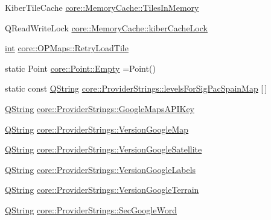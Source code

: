 \begin{DoxyCompactItemize}
\item 
Kiber\-Tile\-Cache \hyperlink{group___o_p_map_widget_gaeb53ae92c08d2646f4ecbcf764e7e226}{core\-::\-Memory\-Cache\-::\-Tiles\-In\-Memory}
\item 
Q\-Read\-Write\-Lock \hyperlink{group___o_p_map_widget_ga9c5f2537ff4510c8890590e73ea95b65}{core\-::\-Memory\-Cache\-::kiber\-Cache\-Lock}
\item 
\hyperlink{ioapi_8h_a787fa3cf048117ba7123753c1e74fcd6}{int} \hyperlink{group___o_p_map_widget_ga21cb35ff34ca1e5eccfe7a0c8f054933}{core\-::\-O\-P\-Maps\-::\-Retry\-Load\-Tile}
\item 
static Point \hyperlink{group___o_p_map_widget_ga8f0f8df337a57e048e21c0410bd1a7e3}{core\-::\-Point\-::\-Empty} =Point()
\item 
static const \hyperlink{group___u_a_v_objects_plugin_gab9d252f49c333c94a72f97ce3105a32d}{Q\-String} \hyperlink{group___o_p_map_widget_ga8e0c0e07bd5f4a133451306c0603f393}{core\-::\-Provider\-Strings\-::levels\-For\-Sig\-Pac\-Spain\-Map} \mbox{[}$\,$\mbox{]}
\item 
\hyperlink{group___u_a_v_objects_plugin_gab9d252f49c333c94a72f97ce3105a32d}{Q\-String} \hyperlink{group___o_p_map_widget_ga4a655ecac5457e2a580ee2c9b7743441}{core\-::\-Provider\-Strings\-::\-Google\-Maps\-A\-P\-I\-Key}
\item 
\hyperlink{group___u_a_v_objects_plugin_gab9d252f49c333c94a72f97ce3105a32d}{Q\-String} \hyperlink{group___o_p_map_widget_ga8c6875ce694aabbd5987f55b816cca2b}{core\-::\-Provider\-Strings\-::\-Version\-Google\-Map}
\item 
\hyperlink{group___u_a_v_objects_plugin_gab9d252f49c333c94a72f97ce3105a32d}{Q\-String} \hyperlink{group___o_p_map_widget_gaeca979ef517e8ce202c7ce19d8f0c52f}{core\-::\-Provider\-Strings\-::\-Version\-Google\-Satellite}
\item 
\hyperlink{group___u_a_v_objects_plugin_gab9d252f49c333c94a72f97ce3105a32d}{Q\-String} \hyperlink{group___o_p_map_widget_gaa55f03ddecd8e241164698587988c456}{core\-::\-Provider\-Strings\-::\-Version\-Google\-Labels}
\item 
\hyperlink{group___u_a_v_objects_plugin_gab9d252f49c333c94a72f97ce3105a32d}{Q\-String} \hyperlink{group___o_p_map_widget_gacab9db5e4f5aff7ca4ea6bc63e1ca876}{core\-::\-Provider\-Strings\-::\-Version\-Google\-Terrain}
\item 
\hyperlink{group___u_a_v_objects_plugin_gab9d252f49c333c94a72f97ce3105a32d}{Q\-String} \hyperlink{group___o_p_map_widget_gaa681a15654ccc6246baadb0d3e51e660}{core\-::\-Provider\-Strings\-::\-Sec\-Google\-Word}

\end{DoxyCompactItemize}
